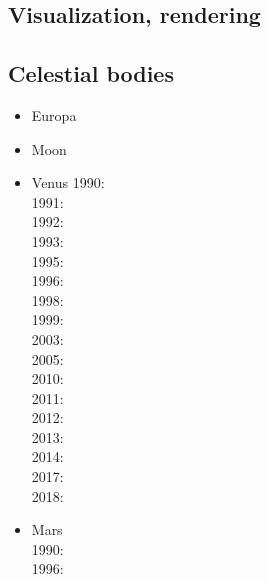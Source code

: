 \subsection{Visualization, rendering}

{\scriptsize
\noindent
\cite{faha}
\cite{chzy08}
\cite{stmt08}
\cite{cram18}
}

\subsection{Celestial bodies}

\begin{itemize}
\item Europa \cite{shha04,shha05,mish05,hash08}\cite{hash10}\cite{hash11,kast14,almc19}
\item Moon 
{\scriptsize
\cite{elvh02}\cite{elhg04}\cite{devv10}\cite{dejv13} \cite{zhdv19}
} 
\item Venus 
{\scriptsize
1990: \cite{scbg90}\\
1991: \cite{lekb91}\\
1992: \cite{kiha92,sqjs92}\\
1993: \cite{kief93,lekb93}\\
1995: \cite{lekb95,mopa95}\\
1996: \cite{somo96}\\
1998: \cite{mazk98}\cite{resm98}\cite{moso98}\cite{phha98}\\
1999: \cite{resm99}\\
2003: \cite{vesh03}\\
2005: \cite{vavv05}\\
2010: \cite{stfh10}\\
2011: \cite{orso11}\\
2012: \cite{arta12}\\
2013: \cite{huyz13}\\
2014: \cite{gita14}\cite{gery14b}\\
2017: \cite{cram17}\cite{dast17}\\
2018: \cite{king18}
}
\item Mars \\
{\scriptsize
1990: \cite{scbg90}\\
1996: \cite{hach96}\\
}
\end{itemize}
